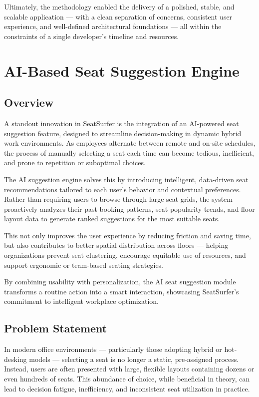 \documentclass[12pt,a4paper]{report}
\begin{document}
Ultimately, the methodology enabled the delivery of a polished, stable, and scalable application — with a clean separation of concerns, consistent user experience, and well-defined architectural foundations — all within the constraints of a single developer's timeline and resources.

\newpage

\chapter{AI-Based Seat Suggestion Engine}

\section{Overview}

A standout innovation in SeatSurfer is the integration of an AI-powered seat suggestion feature, designed to streamline decision-making in dynamic hybrid work environments. As employees alternate between remote and on-site schedules, the process of manually selecting a seat each time can become tedious, inefficient, and prone to repetition or suboptimal choices.

The AI suggestion engine solves this by introducing intelligent, data-driven seat recommendations tailored to each user's behavior and contextual preferences. Rather than requiring users to browse through large seat grids, the system proactively analyzes their past booking patterns, seat popularity trends, and floor layout data to generate ranked suggestions for the most suitable seats.

This not only improves the user experience by reducing friction and saving time, but also contributes to better spatial distribution across floors — helping organizations prevent seat clustering, encourage equitable use of resources, and support ergonomic or team-based seating strategies.

By combining usability with personalization, the AI seat suggestion module transforms a routine action into a smart interaction, showcasing SeatSurfer's commitment to intelligent workplace optimization.

\section{Problem Statement}

In modern office environments — particularly those adopting hybrid or hot-desking models — selecting a seat is no longer a static, pre-assigned process. Instead, users are often presented with large, flexible layouts containing dozens or even hundreds of seats. This abundance of choice, while beneficial in theory, can lead to decision fatigue, inefficiency, and inconsistent seat utilization in practice.
\end{document}
